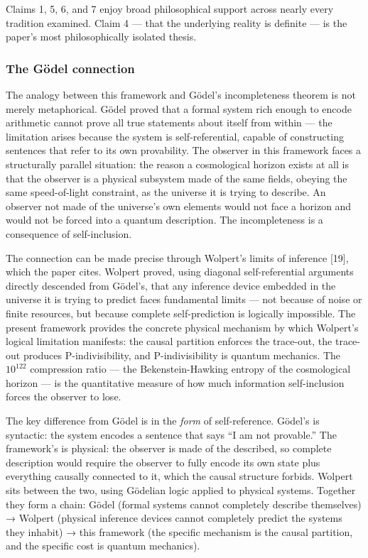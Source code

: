 \documentclass[
]{article}
\begin{document}
Claims 1, 5, 6, and 7 enjoy broad philosophical support across nearly
every tradition examined. Claim 4 --- that the underlying reality is
definite --- is the paper's most philosophically isolated thesis.

\hypertarget{the-guxf6del-connection}{%
\subsubsection{The Gödel connection}\label{the-guxf6del-connection}}

The analogy between this framework and Gödel's incompleteness theorem is
not merely metaphorical. Gödel proved that a formal system rich enough
to encode arithmetic cannot prove all true statements about itself from
within --- the limitation arises because the system is self-referential,
capable of constructing sentences that refer to its own provability. The
observer in this framework faces a structurally parallel situation: the
reason a cosmological horizon exists at all is that the observer is a
physical subsystem made of the same fields, obeying the same
speed-of-light constraint, as the universe it is trying to describe. An
observer not made of the universe's own elements would not face a
horizon and would not be forced into a quantum description. The
incompleteness is a consequence of self-inclusion.

The connection can be made precise through Wolpert's limits of inference
{[}19{]}, which the paper cites. Wolpert proved, using diagonal
self-referential arguments directly descended from Gödel's, that any
inference device embedded in the universe it is trying to predict faces
fundamental limits --- not because of noise or finite resources, but
because complete self-prediction is logically impossible. The present
framework provides the concrete physical mechanism by which Wolpert's
logical limitation manifests: the causal partition enforces the
trace-out, the trace-out produces P-indivisibility, and P-indivisibility
is quantum mechanics. The \(10^{122}\) compression ratio --- the
Bekenstein-Hawking entropy of the cosmological horizon --- is the
quantitative measure of how much information self-inclusion forces the
observer to lose.

The key difference from Gödel is in the \emph{form} of self-reference.
Gödel's is syntactic: the system encodes a sentence that says ``I am not
provable.'' The framework's is physical: the observer is made of the
described, so complete description would require the observer to fully
encode its own state plus everything causally connected to it, which the
causal structure forbids. Wolpert sits between the two, using Gödelian
logic applied to physical systems. Together they form a chain: Gödel
(formal systems cannot completely describe themselves) → Wolpert
(physical inference devices cannot completely predict the systems they
inhabit) → this framework (the specific mechanism is the causal
partition, and the specific cost is quantum mechanics).
\end{document}

